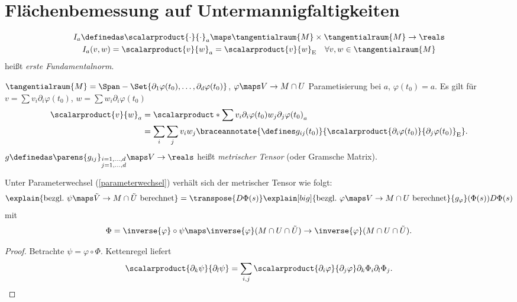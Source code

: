 \section{Flächenbemessung auf Untermannigfaltigkeiten}
\begin{definition*}
  \begin{gather*}
    I_a\definedas \scalarproduct{\cdot}{\cdot}_a\maps \tangentialraum{M}\times\tangentialraum{M}\to \reals\\
    I_a(v,w)=\scalarproduct{v}{w}_{a}=\scalarproduct{v}{w}_{\text{E}}\quad \forall v,w\in \tangentialraum{M}
  \end{gather*}
  heißt \emph{erste Fundamentalnorm}.
\end{definition*}
\begin{bemerkung*}
  \( \tangentialraum{M}=\Span-{\Set{\partial_1 \varphi(t_0),\dotsc,\partial_d \varphi(t_0)}} \), \( \varphi\maps V\to M\cap U \) Parametisierung bei \( a \), \( \varphi(t_0)=a \). Es gilt für \( v=\sum v_i \partial_i \varphi(t_0) \), \( w=\sum w_i \partial_i \varphi(t_0) \)
  \begin{align*}
    \scalarproduct{v}{w}_{a}&=\scalarproduct*{\sum v_i \partial_i \varphi(t_0)}{w_j \partial_j \varphi(t_0)}_{a}\\
    &=\sum_{i}\sum_j v_i w_j \braceannotate{\defines g_{ij}(t_0)}{\scalarproduct{\partial_i \varphi(t_0)}{\partial_j \varphi(t_0)}_{\text{E}}}.
  \end{align*}
  \( g\definedas \parens{g_{ij}}_{\substack{i=1,\dotsc,d\\ j=1,\dotsc,d}}\maps V\to \reals \) heißt \emph{metrischer Tensor} (oder Gramsche Matrix).
\end{bemerkung*}
\begin{lemma}\label{parameterwechsel_metrischer_tensor}
   Unter Parameterwechsel (\vgl \ref{parameterwechsel}) verhält sich der metrischer Tensor wie folgt:
   \begin{equation*}
     \explain{\text{bezgl.\ \( \psi\maps \tilde{V}\to M\cap \tilde{U} \) berechnet}}=\transpose{D\Phi(s)}\explain[big]{\text{bezgl.\ \( \varphi\maps V\to M\cap U \) berechnet}}{g_{\varphi}}(\Phi(s))D\Phi(s)
   \end{equation*}
   mit
   \begin{equation*}
    \Phi=\inverse{\varphi}\circ \psi\maps  \inverse{\varphi}(M\cap U\cap \tilde{U})\to \inverse{\varphi}(M\cap U\cap \tilde{U}).
   \end{equation*}
\end{lemma}
\begin{proof}
  Betrachte \( \psi=\varphi\circ \Phi \). Kettenregel liefert
  \begin{equation*}
    \scalarproduct{\partial_k \psi}{\partial_l \psi}=\sum_{i,j}\scalarproduct{\partial_i \varphi}{\partial_j \varphi}\partial_k \Phi_i\partial_l \Phi_j.
  \end{equation*}
\end{proof}
